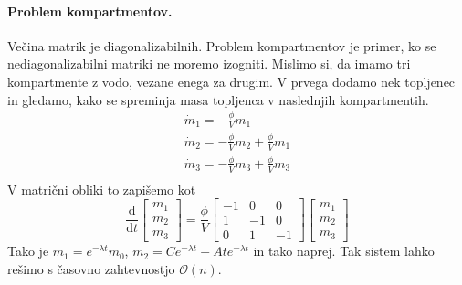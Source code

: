 \documentclass[a4paper]{article}
\newcommand{\dd}[2]{\frac{\mathrm{d} {#1}}{\mathrm{d} {#2}}}
\begin{document}
\paragraph{Problem kompartmentov.} Večina matrik je diagonalizabilnih. Problem kompartmentov je primer, ko se nediagonalizabilni matriki ne moremo izogniti.
Mislimo si, da imamo tri kompartmente z vodo, vezane enega za drugim. V prvega dodamo nek topljenec in gledamo, kako se spreminja masa topljenca v naslednjih kompartmentih.
\begin{eqnarray*}
    \dot{m}_1 = -\frac{\phi}{V}m_1 \\
    \dot{m}_2 = -\frac{\phi}{V}m_2 + \frac{\phi}{V}m_1 \\
    \dot{m}_3 = -\frac{\phi}{V}m_3 + \frac{\phi}{V}m_3 \\
\end{eqnarray*}
V matrični obliki to zapišemo kot
$$\dd{}{t}\begin{bmatrix}
    m_1 \\ m_2 \\ m_3
\end{bmatrix} = \frac{\phi}{V} \begin{bmatrix}
    -1 & 0 & 0 \\
    1 & -1 & 0 \\
    0 & 1 & -1
\end{bmatrix} \begin{bmatrix}
    m_1 \\ m_2 \\ m_3
\end{bmatrix}$$
Tako je $m_1 = e^{-\lambda t}m_0$, $m_2 = Ce^{-\lambda t} + Ate^{-\lambda t}$ in tako naprej. Tak sistem lahko rešimo s časovno zahtevnostjo $\mathcal{O}(n)$.
\end{document}
